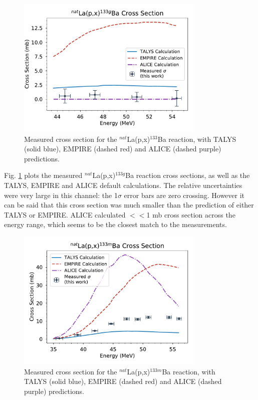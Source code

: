 \documentclass[aps,superscriptaddress,twocolumn,secnumarabic,balancelastpage,amsmath,amssymb,nofootinbib,floatfix]{revtex4-1}
\begin{document}
\begin{figure}[htb]
\includegraphics[width=9cm]{cross_sections/133BAg}
\caption{Measured cross section for the $^{nat}$La(p,x)$^{133}$Ba reaction, with TALYS (solid blue), EMPIRE (dashed red) and ALICE (dashed purple) predictions.
}
\label{fig:133BAg}
\end{figure}

Fig. \ref{fig:133BAg} plots the measured $^{nat}$La(p,x)$^{133g}$Ba reaction cross sections, as well as the TALYS, EMPIRE and ALICE default calculations.  The relative uncertainties were very large in this channel: the 1$\sigma$ error bars are zero crossing.  However it can be said that this cross section was much smaller than the prediction of either TALYS or EMPIRE.  ALICE calculated $<<$1 mb cross section across the energy range, which seems to be the closest match to the measurements.

\begin{figure}[htb]
\includegraphics[width=9cm]{cross_sections/133BAm}
\caption{Measured cross section for the $^{nat}$La(p,x)$^{133m}$Ba reaction, with TALYS (solid blue), EMPIRE (dashed red) and ALICE (dashed purple) predictions.
}
\label{fig:133BAm}
\end{figure}
\end{document}
